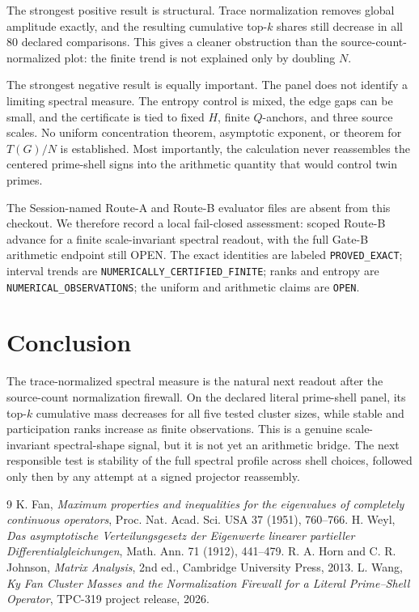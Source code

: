 \documentclass[10pt]{article}
\begin{document}
The strongest positive result is structural.  Trace normalization removes
global amplitude exactly, and the resulting cumulative top-$k$ shares still
decrease in all 80 declared comparisons.  This gives a cleaner obstruction
than the source-count-normalized plot: the finite trend is not explained only
by doubling $N$.

The strongest negative result is equally important.  The panel does not
identify a limiting spectral measure.  The entropy control is mixed, the
edge gaps can be small, and the certificate is tied to fixed $H$, finite
$Q$-anchors, and three source scales.  No uniform concentration theorem,
asymptotic exponent, or theorem for $T(G)/N$ is established.  Most importantly,
the calculation never reassembles the centered prime-shell signs into the
arithmetic quantity that would control twin primes.

The Session-named Route-A and Route-B evaluator files are absent from this
checkout.  We therefore record a local fail-closed assessment: scoped Route-B
advance for a finite scale-invariant spectral readout, with the full Gate-B
arithmetic endpoint still OPEN.  The exact identities are labeled
\texttt{PROVED\_EXACT}; interval trends are
\texttt{NUMERICALLY\_CERTIFIED\_FINITE}; ranks and entropy are
\texttt{NUMERICAL\_OBSERVATIONS}; the uniform and arithmetic claims are
\texttt{OPEN}.

\section{Conclusion}

The trace-normalized spectral measure is the natural next readout after the
source-count normalization firewall.  On the declared literal prime-shell
panel, its top-$k$ cumulative mass decreases for all five tested cluster
sizes, while stable and participation ranks increase as finite observations.
This is a genuine scale-invariant spectral-shape signal, but it is not yet an
arithmetic bridge.  The next responsible test is stability of the full
spectral profile across shell choices, followed only then by any attempt at a
signed projector reassembly.

\begin{thebibliography}{9}
K. Fan, \emph{Maximum properties and inequalities for the eigenvalues of
completely continuous operators}, Proc. Nat. Acad. Sci. USA 37 (1951),
760--766.
H. Weyl, \emph{Das asymptotische Verteilungsgesetz der Eigenwerte linearer
partieller Differentialgleichungen}, Math. Ann. 71 (1912), 441--479.
R. A. Horn and C. R. Johnson, \emph{Matrix Analysis}, 2nd ed.,
Cambridge University Press, 2013.
L. Wang, \emph{Ky Fan Cluster Masses and the Normalization Firewall for a
Literal Prime--Shell Operator}, TPC-319 project release, 2026.
\end{thebibliography}
\end{document}
